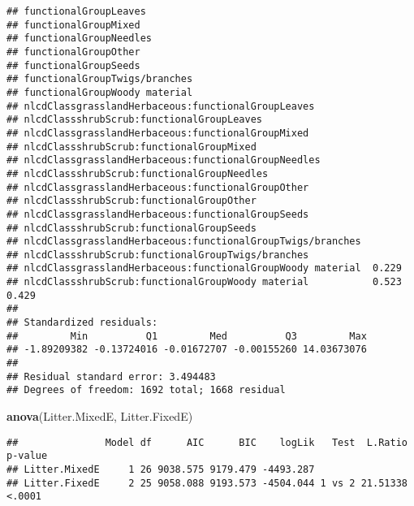 \documentclass[]{article}
\newenvironment{Shaded}{\begin{snugshade}}{\end{snugshade}}
\newcommand{\KeywordTok}[1]{\textcolor[rgb]{0.13,0.29,0.53}{\textbf{#1}}}
\newcommand{\NormalTok}[1]{#1}
\begin{document}
\begin{verbatim}
## functionalGroupLeaves                                                   
## functionalGroupMixed                                                    
## functionalGroupNeedles                                                  
## functionalGroupOther                                                    
## functionalGroupSeeds                                                    
## functionalGroupTwigs/branches                                           
## functionalGroupWoody material                                           
## nlcdClassgrasslandHerbaceous:functionalGroupLeaves                      
## nlcdClassshrubScrub:functionalGroupLeaves                               
## nlcdClassgrasslandHerbaceous:functionalGroupMixed                       
## nlcdClassshrubScrub:functionalGroupMixed                                
## nlcdClassgrasslandHerbaceous:functionalGroupNeedles                     
## nlcdClassshrubScrub:functionalGroupNeedles                              
## nlcdClassgrasslandHerbaceous:functionalGroupOther                       
## nlcdClassshrubScrub:functionalGroupOther                                
## nlcdClassgrasslandHerbaceous:functionalGroupSeeds                       
## nlcdClassshrubScrub:functionalGroupSeeds                                
## nlcdClassgrasslandHerbaceous:functionalGroupTwigs/branches              
## nlcdClassshrubScrub:functionalGroupTwigs/branches                       
## nlcdClassgrasslandHerbaceous:functionalGroupWoody material  0.229       
## nlcdClassshrubScrub:functionalGroupWoody material           0.523  0.429
## 
## Standardized residuals:
##         Min          Q1         Med          Q3         Max 
## -1.89209382 -0.13724016 -0.01672707 -0.00155260 14.03673076 
## 
## Residual standard error: 3.494483 
## Degrees of freedom: 1692 total; 1668 residual
\end{verbatim}

\begin{Shaded}
\begin{Highlighting}[]
\KeywordTok{anova}\NormalTok{(Litter.MixedE, Litter.FixedE)}
\end{Highlighting}
\end{Shaded}

\begin{verbatim}
##               Model df      AIC      BIC    logLik   Test  L.Ratio p-value
## Litter.MixedE     1 26 9038.575 9179.479 -4493.287                        
## Litter.FixedE     2 25 9058.088 9193.573 -4504.044 1 vs 2 21.51338  <.0001
\end{verbatim}
\end{document}
